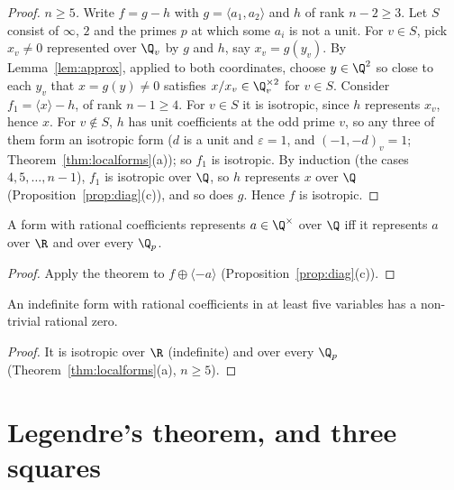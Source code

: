 \begin{proof}
\emph{$n\ge5$.} Write $f=g-h$ with $g=\langle a_1,a_2\rangle$ and $h$ of rank $n-2\ge3$. Let $S$ consist of $\infty$, $2$ and the
primes $p$ at which some $a_i$ is not a unit. For $v\in S$, pick $x_v\ne0$ represented over $\Q_v$ by $g$ and $h$, say $x_v=g(y_v)$.
By Lemma~\ref{lem:approx}, applied to both coordinates, choose $y\in\Q^2$ so close to each $y_v$ that $x=g(y)\ne0$ satisfies
$x/x_v\in\Q_v^{\times2}$ for $v\in S$. Consider $f_1=\langle x\rangle-h$, of rank $n-1\ge4$. For $v\in S$ it is isotropic, since $h$
represents $x_v$, hence $x$. For $v\notin S$, $h$ has unit coefficients at the odd prime $v$, so any three of them form an
isotropic form ($d$ is a unit and $\varepsilon=1$, and $(-1,-d)_v=1$; Theorem~\ref{thm:localforms}(a)); so $f_1$ is isotropic.
By induction (the cases $4,5,\dots,n-1$), $f_1$ is isotropic over $\Q$, so $h$ represents $x$ over $\Q$ (Proposition~\ref{prop:diag}(c)),
and so does $g$. Hence $f$ is isotropic.
\end{proof}

\begin{corollary}\label{cor:hmrep}
A form with rational coefficients represents $a\in\Q^\times$ over $\Q$ iff it represents $a$ over $\R$ and over every $\Q_p$.
\end{corollary}
\begin{proof}
Apply the theorem to $f\oplus\langle-a\rangle$ (Proposition~\ref{prop:diag}(c)).
\end{proof}

\begin{corollary}[Meyer, 1884]\label{cor:meyer}
An indefinite form with rational coefficients in at least five variables has a non-trivial rational zero.
\end{corollary}
\begin{proof}
It is isotropic over $\R$ (indefinite) and over every $\Q_p$ (Theorem~\ref{thm:localforms}(a), $n\ge5$).
\end{proof}

\section{Legendre's theorem, and three squares}

